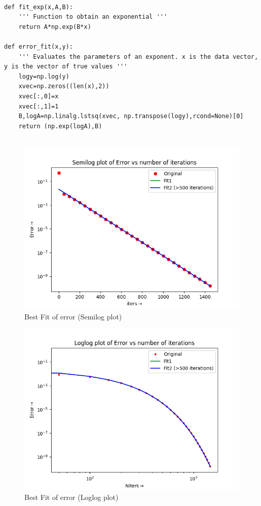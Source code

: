 \documentclass{article}
\begin{document}
\begin{lstlisting}

def fit_exp(x,A,B):
    ''' Function to obtain an exponential '''
    return A*np.exp(B*x)

def error_fit(x,y):
    ''' Evaluates the parameters of an exponent. x is the data vector, y is the vector of true values ''' 
    logy=np.log(y)
    xvec=np.zeros((len(x),2))
    xvec[:,0]=x
    xvec[:,1]=1
    B,logA=np.linalg.lstsq(xvec, np.transpose(logy),rcond=None)[0]
    return (np.exp(logA),B)


\end{lstlisting}
\begin{figure}[h!]
\centering
\includegraphics[scale=0.6]{plots/Semilog plot of Error vs number of iterations.png}
\caption{Best Fit of error (Semilog plot)}
\label{fig:Best Fit of error (Semilog plot)} 
\end{figure}
\begin{figure}[h!]
\centering
\includegraphics[scale=0.6]{plots/Loglog plot of Error vs number of iterations.png}
\caption{Best Fit of error (Loglog plot)}
\label{fig:Best Fit of error (Loglog plot)}
\end{figure}
\end{document}
